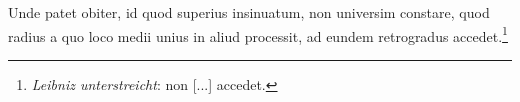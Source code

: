  \pstart [p.~17] Unde patet obiter, id quod superius insinuatum, non universim constare, quod radius\protect{} a quo loco medii unius in aliud processit, ad eundem retrogradus accedet.\footnote{\textit{Leibniz unterstreicht}: non [...] accedet.}
 \pend